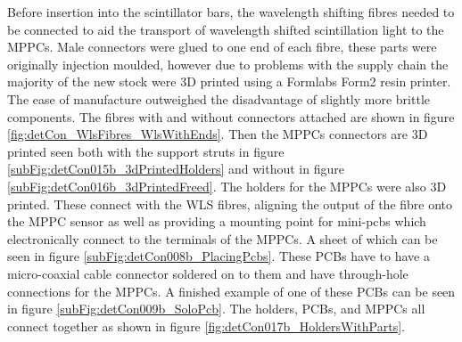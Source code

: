 Before insertion into the scintillator bars, the wavelength shifting fibres needed to be connected to aid the transport of wavelength shifted scintillation light to the MPPCs. Male connectors were glued to one end of each fibre, these parts were originally injection moulded, however due to problems with the supply chain the majority of the new stock were 3D printed using a Formlabs Form2 resin printer. The ease of manufacture outweighed the disadvantage of slightly more brittle components. The fibres with and without connectors attached are shown in figure \ref{fig:detCon_WlsFibres_WlsWithEnds}. Then the MPPCs connectors are 3D printed seen both with the support struts in figure \ref{subFig:detCon015b_3dPrintedHolders} and without in figure \ref{subFig:detCon016b_3dPrintedFreed}. The holders for the MPPCs were also 3D printed. These connect with the WLS fibres, aligning the output of the fibre onto the MPPC sensor as well as providing a mounting point for mini-pcbs which electronically connect to the terminals of the MPPCs. A sheet of which can be seen in figure \ref{subFig:detCon008b_PlacingPcbs}. These PCBs have to have a micro-coaxial cable connector soldered on to them and have through-hole connections for the MPPCs. A finished example of one of these PCBs can be seen in figure \ref{subFig:detCon009b_SoloPcb}. The holders, PCBs, and MPPCs all connect together as shown in figure \ref{fig:detCon017b_HoldersWithParts}. 

